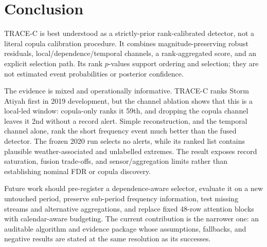 \section{Conclusion}

TRACE-C is best understood as a strictly-prior rank-calibrated detector, not a
literal copula calibration procedure. It combines magnitude-preserving robust
residuals, local/dependence/temporal channels, a rank-aggregated score, and an
explicit selection path. Its rank $p$-values support ordering and selection;
they are not estimated event probabilities or posterior confidence.

The evidence is mixed and operationally informative. TRACE-C ranks Storm
Atiyah first in 2019 development, but the channel ablation shows that this is
a local-led window: copula-only ranks it 59th, and dropping the copula channel
leaves it 2nd without a record alert. Simple reconstruction, and the temporal
channel alone, rank the short frequency event much better than the fused
detector. The frozen 2020 run selects no alerts, while its ranked list contains
plausible weather-associated and unlabelled extremes. The result exposes record
saturation, fusion trade-offs, and sensor/aggregation limits rather than
establishing nominal FDR or copula discovery.

Future work should pre-register a dependence-aware selector, evaluate it on a
new untouched period, preserve sub-period frequency information, test missing
streams and alternative aggregations, and replace fixed 48-row attention blocks
with calendar-aware budgeting. The current contribution is the narrower one:
an auditable algorithm and evidence package whose assumptions, fallbacks, and
negative results are stated at the same resolution as its successes.
